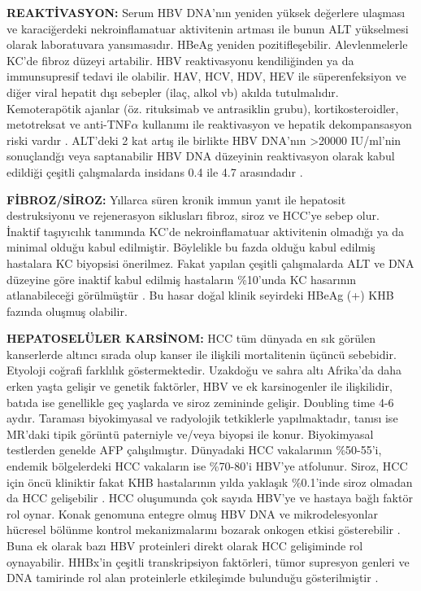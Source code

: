 \textbf{REAKTİVASYON:} Serum HBV DNA'nın yeniden yüksek değerlere ulaşması ve karaciğerdeki nekroinflamatuar aktivitenin artması ile bunun ALT yükselmesi olarak laboratuvara yansımasıdır. HBeAg yeniden pozitifleşebilir. Alevlenmelerle KC'de fibroz düzeyi artabilir. HBV reaktivasyonu kendiliğinden ya da immunsupresif tedavi ile olabilir. HAV, HCV, HDV, HEV ile süperenfeksiyon ve diğer viral hepatit dışı sebepler (ilaç, alkol vb) akılda tutulmalıdır. Kemoterapötik ajanlar (öz. rituksimab ve antrasiklin grubu), kortikosteroidler, metotreksat ve anti-TNF$ \alpha $ kullanımı ile reaktivasyon ve hepatik dekompansasyon riski vardır \cite{yeo2006diagnosis,yeo2008hepatitis,xuan2014hepatitis}. ALT'deki 2 kat artış ile birlikte HBV DNA'nın >20000 IU/ml'nin sonuçlandğı veya saptanabilir HBV DNA düzeyinin reaktivasyon olarak kabul edildiği çeşitli çalışmalarda insidans 0.4 ile 4.7 arasındadır \cite{martinot2002serum,papatheodoridis2008longitudinal,chu2007spontaneous,kumar2009spontaneous,tong2013hepatitis,zacharakis2008role}.


\textbf{FİBROZ/SİROZ:} Yıllarca süren kronik immun yanıt ile hepatosit destruksiyonu ve rejenerasyon siklusları fibroz, siroz ve HCC'ye sebep olur. İnaktif taşıyıcılık tanımında KC'de nekroinflamatuar aktivitenin olmadığı ya da minimal olduğu kabul edilmiştir. Böylelikle bu fazda olduğu kabul edilmiş hastalara KC biyopsisi önerilmez. Fakat yapılan çeşitli çalışmalarda ALT ve DNA düzeyine göre inaktif kabul edilmiş hastaların \%10'unda KC hasarının atlanabileceği görülmüştür \cite{villa2011natural,papatheodoridis2012follow}. Bu hasar doğal klinik seyirdeki HBeAg (+) KHB fazında oluşmuş olabilir. 


\textbf{HEPATOSELÜLER KARSİNOM:} HCC tüm dünyada en sık görülen kanserlerde altıncı sırada olup kanser ile ilişkili mortalitenin üçüncü sebebidir. Etyoloji coğrafi farklılık göstermektedir. Uzakdoğu ve sahra altı Afrika'da daha erken yaşta gelişir ve genetik faktörler, HBV ve ek karsinogenler ile ilişkilidir, batıda ise genellikle geç yaşlarda ve siroz zemininde gelişir. Doubling time 4-6 aydır.   Taraması biyokimyasal ve radyolojik tetkiklerle yapılmaktadır, tanısı ise MR'daki tipik görüntü paterniyle ve/veya biyopsi ile konur. Biyokimyasal testlerden genelde AFP çalışılmıştır. Dünyadaki HCC vakalarının \%50-55'i, endemik bölgelerdeki HCC vakaların ise \%70-80'i HBV'ye atfolunur. Siroz, HCC için öncü kliniktir fakat KHB hastalarının yılda yaklaşık \%0.1'inde siroz olmadan da HCC gelişebilir \cite{fattovich2008natural,chayanupatkul2017hepatocellular}. HCC oluşumunda çok sayıda HBV'ye ve hastaya bağlı faktör rol oynar. Konak genomuna entegre olmuş HBV DNA ve mikrodelesyonlar hücresel bölünme kontrol mekanizmalarını bozarak onkogen etkisi gösterebilir \cite{matsubara1990integration}. Buna ek olarak bazı HBV proteinleri direkt olarak HCC gelişiminde rol oynayabilir. HHBx'in çeşitli transkripsiyon faktörleri, tümor supresyon genleri ve DNA tamirinde rol alan proteinlerle  etkileşimde bulunduğu gösterilmiştir \cite{chisari2010pathogenesis,kremsdorf2006hepatitis}.

